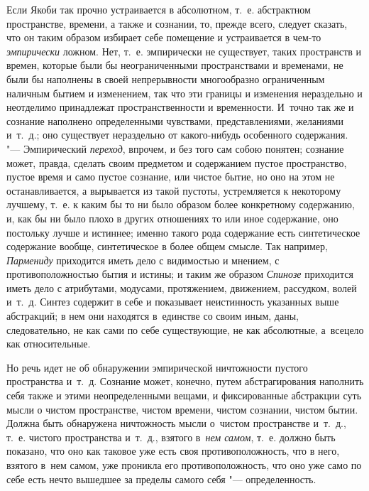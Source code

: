 Если Якоби так прочно устраивается в абсолютном, т.~е. абстрактном
пространстве, времени, а также и сознании, то, прежде всего, следует сказать,
что он таким образом избирает себе помещение и устраивается в чем-то
{\em эмпирически} ложном. Нет, т.~е. эмпирически не существует, таких
пространств и времен, которые были бы неограниченными пространствами и
временами, не были бы наполнены в своей непрерывности многообразно ограниченным
наличным бытием и изменением, так что эти границы и изменения нераздельно и
неотделимо принадлежат пространственности и временности. И~точно так же и
сознание наполнено определенными чувствами, представлениями, желаниями и~т.~д.;
оно существует нераздельно от какого-нибудь особенного содержания. "---
Эмпирический {\em переход}, впрочем, и без того сам собою понятен; сознание
может, правда, сделать своим предметом и содержанием пустое пространство,
пустое время и само пустое сознание, или чистое бытие, но оно на этом не
останавливается, а вырывается из такой пустоты, устремляется к некоторому
лучшему, т.~е. к каким бы то ни было образом более конкретному содержанию, и,
как бы ни было плохо в других отношениях то или иное содержание, оно постольку
лучше и истиннее; именно такого рода содержание есть синтетическое содержание
вообще, синтетическое в более общем смысле. Так например, {\em Пармениду}
приходится иметь дело с видимостью и мнением, с противоположностью бытия и
истины; и таким же образом {\em Спинозе} приходится иметь дело с атрибутами,
модусами, протяжением, движением, рассудком, волей и~т.~д. Синтез содержит в
себе и показывает неистинность указанных выше абстракций; в нем они находятся
в~единстве со своим иным, даны, следовательно, не как сами по себе
существующие, не как абсолютные, а~всецело как относительные.

Но речь идет не об обнаружении эмпирической ничтожности пустого пространства
и~т.~д. Сознание может, конечно, путем абстрагирования наполнить себя также и
этими неопределенными вещами, и фиксированные абстракции суть мысли о чистом
пространстве, чистом времени, чистом сознании, чистом бытии. Должна быть
обнаружена ничтожность мысли о~чистом пространстве и~т.~д., т.~е. чистого
пространства и~т.~д., взятого в~{\em нем самом}, т.~е. должно быть показано,
что оно как таковое уже есть своя противоположность, что в него, взятого в~нем
самом, уже проникла его противоположность, что оно уже само по себе есть нечто
вышедшее за пределы самого себя "--- определенность.

